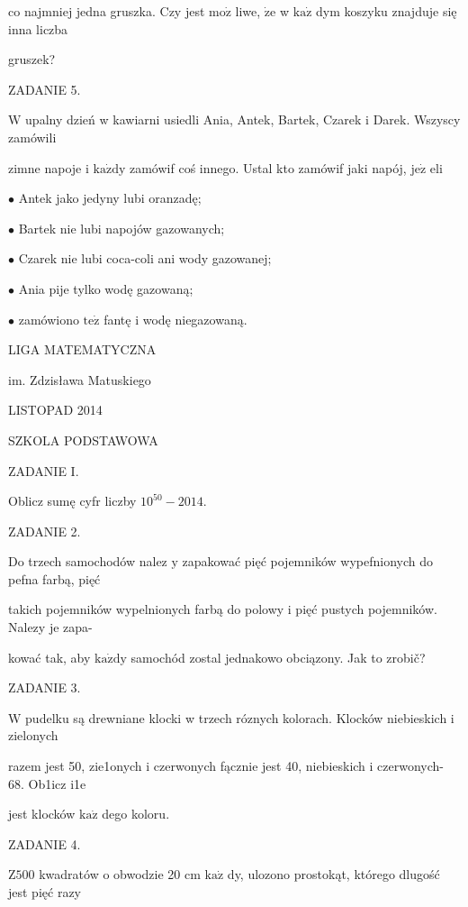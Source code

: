 \documentclass[a4paper,12pt]{article}
\begin{document}
co najmniej jedna gruszka. Czy jest $\mathrm{m}\mathrm{o}\dot{\mathrm{z}}$ liwe, $\dot{\mathrm{z}}\mathrm{e}$ w $\mathrm{k}\mathrm{a}\dot{\mathrm{z}}$ dym koszyku znajduje się inna liczba

gruszek?

ZADANIE 5.

$\mathrm{W}$ upalny dzień w kawiarni usiedli Ania, Antek, Bartek, Czarek i Darek. Wszyscy zamówili

zimne napoje i $\mathrm{k}\mathrm{a}\dot{\mathrm{z}}\mathrm{d}\mathrm{y}$ zamówif coś innego. Ustal kto zamówif jaki napój, $\mathrm{j}\mathrm{e}\dot{\mathrm{z}}$ eli

$\bullet$ Antek jako jedyny lubi oranzadę;

$\bullet$ Bartek nie lubi napojów gazowanych;

$\bullet$ Czarek nie lubi coca-coli ani wody gazowanej;

$\bullet$ Ania pije tylko wodę gazowaną;

$\bullet$ zamówiono $\mathrm{t}\mathrm{e}\dot{\mathrm{z}}$ fantę i wodę niegazowaną.






LIGA MATEMATYCZNA

im. Zdzisława Matuskiego

LISTOPAD 2014

SZKOLA PODSTAWOWA

ZADANIE I.

Oblicz sumę cyfr liczby $10^{50}-2014.$

ZADANIE 2.

Do trzech samochodów nalez $\mathrm{y}$ zapakować pięć pojemników wypefnionych do pefna farbą, pięć

takich pojemników wypelnionych farbą do polowy i pięć pustych pojemników. Nalezy je zapa-

kować tak, aby $\mathrm{k}\mathrm{a}\dot{\mathrm{z}}\mathrm{d}\mathrm{y}$ samochód zostal jednakowo obciązony. Jak to zrobič?

ZADANIE 3.

$\mathrm{W}$ pudelku są drewniane klocki w trzech róznych kolorach. Klocków niebieskich i zielonych

razem jest 50, zie1onych i czerwonych fącznie jest 40, niebieskich i czerwonych- 68. Ob1icz i1e

jest klocków $\mathrm{k}\mathrm{a}\dot{\mathrm{z}}$ dego koloru.

ZADANIE 4.

$\mathrm{Z}500$ kwadratów o obwodzie 20 cm $\mathrm{k}\mathrm{a}\dot{\mathrm{z}}$ dy, ulozono prostokąt, którego dlugość jest pięć razy
\end{document}
